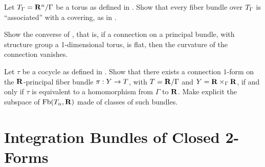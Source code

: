 \begin{exercise}
  \label{Fiber-bundles-over-tori}
  Let $T_\Gamma = {\mathbf R}^n/\Gamma$ be a torus as defined in .
  Show that every fiber bundle over $T_\Gamma$ is ``associated'' with a covering,
  as in .
\end{exercise} %

\begin{exercise}
  \label{Flat-connections-on-toric-bundles}
  Show the converse of
  \linebreak
  ,
  that is,
  if a connection on a principal bundle,
  with structure group a 1-dimensional torus,
  is flat,
  then the curvature of the connection vanishes.
\end{exercise} %

\begin{exercise}
  \label{Connection-forms-over-tori}
  Let $\tau$ be a cocycle as defined in .
  Show that there exists a connection $1$-form on the ${\mathbf R}$-principal fiber bundle $\pi : Y \to T$, with $T = {\mathbf R}/\Gamma$ and $Y = {\mathbf R} \times_\Gamma {\mathbf R}$,
  if and only if $\tau$ is equivalent to a homomorphism from $\Gamma$ to ${\mathbf R}$.
  Make explicit the subspace of $\operatorname{Fb}(T_\alpha,{\mathbf R})$ made of classes of such bundles.
\end{exercise} %


\section*{Integration Bundles of Closed 2-Forms}
\label{sec-Integration-bundles-of-closed-2-forms}

